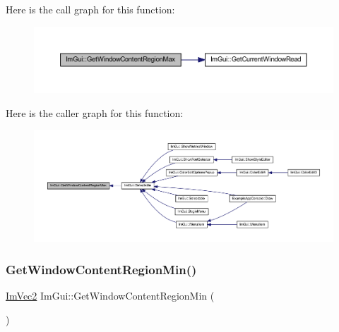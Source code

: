 Here is the call graph for this function\+:
\nopagebreak
\begin{figure}[H]
\begin{center}
\leavevmode
\includegraphics[width=350pt]{namespace_im_gui_a96ce6060592d3ef975594357e650adc6_cgraph}
\end{center}
\end{figure}
Here is the caller graph for this function\+:
\nopagebreak
\begin{figure}[H]
\begin{center}
\leavevmode
\includegraphics[width=350pt]{namespace_im_gui_a96ce6060592d3ef975594357e650adc6_icgraph}
\end{center}
\end{figure}
\mbox{\label{namespace_im_gui_a790123aa15c266798f35050ba36b7197}} 
\subsubsection{\texorpdfstring{Get\+Window\+Content\+Region\+Min()}{GetWindowContentRegionMin()}}
{\footnotesize\ttfamily \mbox{\hyperlink{struct_im_vec2}{Im\+Vec2}} Im\+Gui\+::\+Get\+Window\+Content\+Region\+Min (\begin{DoxyParamCaption}{ }\end{DoxyParamCaption})}

